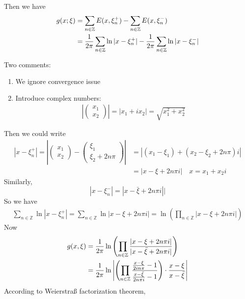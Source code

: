 \documentclass{article}
\numberwithin{equation}{section}
\newcommand{\<}{\langle}
\begin{document}
Then we have 
\begin{align}
	g(x;\xi) &= \sum_{n \in \mathbb{Z}} E(x, \xi_n^+) - \sum_{n \in \mathbb{Z}} E(x, \xi_n^-) \notag \\
	&= \frac{1}{2 \pi} \sum_{n \in \mathbb{Z}} \ln |x- \xi_n^+| -\frac{1}{2 \pi} \sum_{n \in \mathbb{Z}} \ln |x- \xi_n^-| 
\end{align}
\begin{tcolorbox}[colback=green!20!white]
Two comments:
\begin{enumerate}
	\item We ignore convergence issue
	\item Introduce complex numbers:
	\begin{align}
	\left|\begin{pmatrix}
			x_1 \\ x_2
		\end{pmatrix}\right| = |x_1+ ix_2| = \sqrt{x_1^2+x_2^2}
	\end{align}
\end{enumerate}
\end{tcolorbox}
Then we could write 
\begin{align*}
	|x- \xi_n^+| = \left| \begin{pmatrix}
		x_1 \\ x_2
	\end{pmatrix} - \begin{pmatrix}
		\xi_1 \\ \xi_2 + 2n \pi
	\end{pmatrix}\right| 
	& = |(x_1 -\xi_1) + (x_2- \xi_2 + 2 n \pi)i| \\
	& = |x - \xi + 2 n \pi i| \quad x = x_1 + x_2 i
\end{align*}
Similarly,
\[
	|x - \xi_n^-| = |x - \bar{\xi} + 2n \pi i ||
\]
So we have 
\begin{align}
	\sum_{n \in \mathbb{Z}} \ln |x - \xi_n^+| = \sum_{n \in \mathbb{Z}} \ln |x - \xi+ 2n \pi i| = \ln \left( \prod _{n \in \mathbb{Z} } |x- \xi + 2n \pi i|\right)
\end{align}
Now 
\begin{align}
	g(x , \xi) & = \frac{1}{ 2 \pi} \ln \left( \prod _{n \in \mathbb{Z} }  \frac{|x- \xi + 2n \pi i|}{ |x- \bar{ \xi}+ 2n \pi i|}\right) \notag\\
	&= \frac{1}{2 \pi} \ln \left| \left(\prod _{n \in \mathbb{Z} } \frac{\frac{x -\xi}{2 i n \pi}-1 }{\frac{x - \bar{\xi}}{2 n \pi i}-1}\right) \cdot \frac{x - \xi}{x - \bar\xi} \right|
\end{align}
According to Weierstraß factorization theorem,
\end{document}
